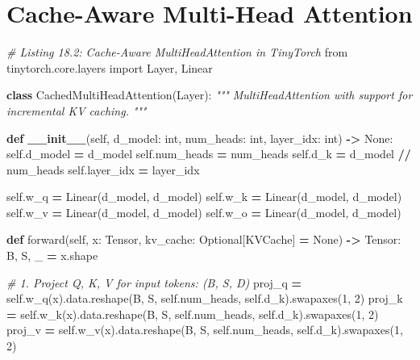 \documentclass[
  letterpaper,
]{scrbook}
\newenvironment{Shaded}{\begin{snugshade}}{\end{snugshade}}
\newcommand{\BuiltInTok}[1]{#1}
\newcommand{\CommentTok}[1]{\textcolor[rgb]{0.56,0.35,0.01}{\textit{#1}}}
\newcommand{\DecValTok}[1]{\textcolor[rgb]{0.00,0.00,0.81}{#1}}
\newcommand{\FunctionTok}[1]{\textcolor[rgb]{0.13,0.29,0.53}{\textbf{#1}}}
\newcommand{\ImportTok}[1]{#1}
\newcommand{\KeywordTok}[1]{\textcolor[rgb]{0.13,0.29,0.53}{\textbf{#1}}}
\newcommand{\NormalTok}[1]{#1}
\newcommand{\OperatorTok}[1]{\textcolor[rgb]{0.81,0.36,0.00}{\textbf{#1}}}
\newcommand{\VariableTok}[1]{\textcolor[rgb]{0.00,0.00,0.00}{#1}}
\begin{document}
\section{Cache-Aware Multi-Head
Attention}\label{cache-aware-multi-head-attention}

\begin{Shaded}
\begin{Highlighting}[]
\CommentTok{\# Listing 18.2: Cache{-}Aware MultiHeadAttention in TinyTorch}
\ImportTok{from}\NormalTok{ tinytorch.core.layers }\ImportTok{import}\NormalTok{ Layer, Linear}

\KeywordTok{class}\NormalTok{ CachedMultiHeadAttention(Layer):}
    \CommentTok{"""}
\CommentTok{    MultiHeadAttention with support for incremental KV caching.}
\CommentTok{    """}

    \KeywordTok{def} \FunctionTok{\_\_init\_\_}\NormalTok{(}\VariableTok{self}\NormalTok{, d\_model: }\BuiltInTok{int}\NormalTok{, num\_heads: }\BuiltInTok{int}\NormalTok{, layer\_idx: }\BuiltInTok{int}\NormalTok{) }\OperatorTok{{-}\textgreater{}} \VariableTok{None}\NormalTok{:}
        \VariableTok{self}\NormalTok{.d\_model }\OperatorTok{=}\NormalTok{ d\_model}
        \VariableTok{self}\NormalTok{.num\_heads }\OperatorTok{=}\NormalTok{ num\_heads}
        \VariableTok{self}\NormalTok{.d\_k }\OperatorTok{=}\NormalTok{ d\_model }\OperatorTok{//}\NormalTok{ num\_heads}
        \VariableTok{self}\NormalTok{.layer\_idx }\OperatorTok{=}\NormalTok{ layer\_idx}

        \VariableTok{self}\NormalTok{.w\_q }\OperatorTok{=}\NormalTok{ Linear(d\_model, d\_model)}
        \VariableTok{self}\NormalTok{.w\_k }\OperatorTok{=}\NormalTok{ Linear(d\_model, d\_model)}
        \VariableTok{self}\NormalTok{.w\_v }\OperatorTok{=}\NormalTok{ Linear(d\_model, d\_model)}
        \VariableTok{self}\NormalTok{.w\_o }\OperatorTok{=}\NormalTok{ Linear(d\_model, d\_model)}

    \KeywordTok{def}\NormalTok{ forward(}\VariableTok{self}\NormalTok{, x: Tensor, kv\_cache: Optional[KVCache] }\OperatorTok{=} \VariableTok{None}\NormalTok{) }\OperatorTok{{-}\textgreater{}}\NormalTok{ Tensor:}
\NormalTok{        B, S, \_ }\OperatorTok{=}\NormalTok{ x.shape}

        \CommentTok{\# 1. Project Q, K, V for input tokens: (B, S, D)}
\NormalTok{        proj\_q }\OperatorTok{=} \VariableTok{self}\NormalTok{.w\_q(x).data.reshape(B, S, }\VariableTok{self}\NormalTok{.num\_heads, }\VariableTok{self}\NormalTok{.d\_k).swapaxes(}\DecValTok{1}\NormalTok{, }\DecValTok{2}\NormalTok{)}
\NormalTok{        proj\_k }\OperatorTok{=} \VariableTok{self}\NormalTok{.w\_k(x).data.reshape(B, S, }\VariableTok{self}\NormalTok{.num\_heads, }\VariableTok{self}\NormalTok{.d\_k).swapaxes(}\DecValTok{1}\NormalTok{, }\DecValTok{2}\NormalTok{)}
\NormalTok{        proj\_v }\OperatorTok{=} \VariableTok{self}\NormalTok{.w\_v(x).data.reshape(B, S, }\VariableTok{self}\NormalTok{.num\_heads, }\VariableTok{self}\NormalTok{.d\_k).swapaxes(}\DecValTok{1}\NormalTok{, }\DecValTok{2}\NormalTok{)}


\end{Highlighting}
\end{Shaded}
\end{document}
